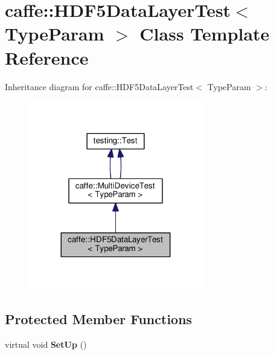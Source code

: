 \hypertarget{classcaffe_1_1_h_d_f5_data_layer_test}{}\section{caffe\+:\+:H\+D\+F5\+Data\+Layer\+Test$<$ Type\+Param $>$ Class Template Reference}
\label{classcaffe_1_1_h_d_f5_data_layer_test}


Inheritance diagram for caffe\+:\+:H\+D\+F5\+Data\+Layer\+Test$<$ Type\+Param $>$\+:
\nopagebreak
\begin{figure}[H]
\begin{center}
\leavevmode
\includegraphics[width=215pt]{classcaffe_1_1_h_d_f5_data_layer_test__inherit__graph}
\end{center}
\end{figure}
\subsection*{Protected Member Functions}
\begin{DoxyCompactItemize}
\item 
\mbox{\label{classcaffe_1_1_h_d_f5_data_layer_test_ac09c42472542ee1a49adfb2fc0509530}} 
virtual void {\bfseries Set\+Up} ()
\end{DoxyCompactItemize}
